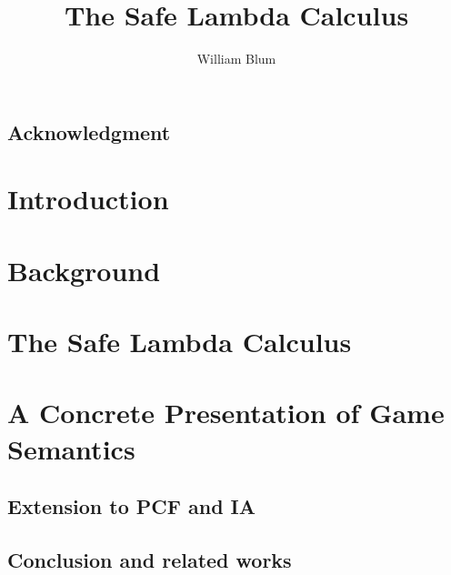 \documentclass[11pt,a4paper,twoside,openright,draft]{myown}
\author{William Blum}
\title{The Safe Lambda Calculus}
\begin{document}
\maketitle

\begin{romanpages}
\begin{abstract}

\end{abstract}

\ifforexaminers
\else
\chapter*{Acknowledgment}

\fi

\tableofcontents
\listoffigures
\listoftables
\end{romanpages}

\ifdraftmode\listoftodos\bigskip\fi

\chapter{Introduction}
    


\chapter{Background}
\label{chap:background}
    

\chapter{The Safe Lambda Calculus}
\label{chap:safelambda}
    
    
    
    
    
    
    


\chapter{A Concrete Presentation of Game Semantics}
    \label{chap:concrete_gamesem}
    

    \section{Extension to PCF and IA}
    

    \section{Conclusion and related works}
    
\end{document}
